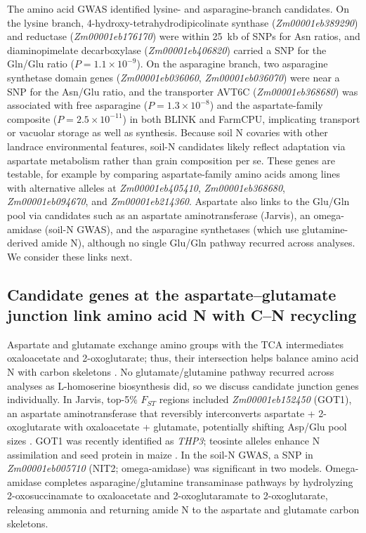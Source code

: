 The amino acid GWAS identified lysine- and asparagine-branch candidates. On the lysine branch, 4-hydroxy-tetrahydrodipicolinate synthase (\textit{Zm00001eb389290}) and reductase (\textit{Zm00001eb176170}) were within 25~kb of SNPs for Asn ratios, and diaminopimelate decarboxylase (\textit{Zm00001eb406820}) carried a SNP for the Gln/Glu ratio ($P = 1.1 \times 10^{-9}$). On the asparagine branch, two asparagine synthetase domain genes (\textit{Zm00001eb036060}, \textit{Zm00001eb036070}) were near a SNP for the Asn/Glu ratio, and the transporter AVT6C (\textit{Zm00001eb368680}) was associated with free asparagine ($P = 1.3 \times 10^{-8}$) and the aspartate-family composite ($P = 2.5 \times 10^{-11}$) in both BLINK and FarmCPU, implicating transport or vacuolar storage as well as synthesis. Because soil N covaries with other landrace environmental features, soil-N candidates likely reflect adaptation via aspartate metabolism rather than grain composition per se. These genes are testable, for example by comparing aspartate-family amino acids among lines with alternative alleles at \textit{Zm00001eb405410}, \textit{Zm00001eb368680}, \textit{Zm00001eb094670}, and \textit{Zm00001eb214360}. Aspartate also links to the Glu/Gln pool via candidates such as an aspartate aminotransferase (Jarvis), an omega-amidase (soil-N GWAS), and the asparagine synthetases (which use glutamine-derived amide N), although no single Glu/Gln pathway recurred across analyses. We consider these links next.

\subsection{Candidate genes at the aspartate--glutamate junction link amino acid N with C--N recycling}

Aspartate and glutamate exchange amino groups with the TCA intermediates oxaloacetate and 2-oxoglutarate; thus, their intersection helps balance amino acid N with carbon skeletons \citep{Han2021Aspartate}. No glutamate/glutamine pathway recurred across analyses as L-homoserine biosynthesis did, so we discuss candidate junction genes individually. In Jarvis, top-5\% $F_{ST}$ regions included \textit{Zm00001eb152450} (GOT1), an aspartate aminotransferase that reversibly interconverts aspartate + 2-oxoglutarate with oxaloacetate + glutamate, potentially shifting Asp/Glu pool sizes \citep{Han2021Aspartate,Zhou2009AspAT}. GOT1 was recently identified as \textit{THP3}; teosinte alleles enhance N assimilation and seed protein in maize \citep{Huang2026THP3}. In the soil-N GWAS, a SNP in \textit{Zm00001eb005710} (NIT2; omega-amidase) was significant in two models. Omega-amidase completes asparagine/glutamine transaminase pathways by hydrolyzing 2-oxosuccinamate to oxaloacetate and 2-oxoglutaramate to 2-oxoglutarate, releasing ammonia \citep{Zhang2014OmegaAmidase} and returning amide N to the aspartate and glutamate carbon skeletons.

